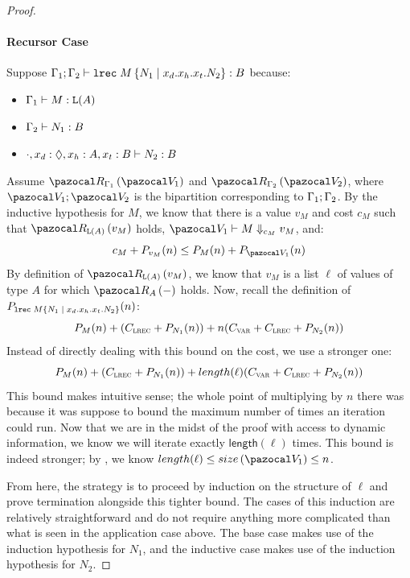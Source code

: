 \begin{proof}
\paragraph{Recursor Case} Suppose $\types{\ctxappend{\ctx_1}{\ctx_2}}{\tmrec{M}{N_1}{x_d}{x_h}{x_t}{N_2}}{B}$ because:
\begin{itemize}
  \item $\types{\ctx_1}{M}{\tplist{A}}$
  \item $\Gamma_2 \vdash N_1 : B$
  \item $\types{\ctxcons{\ctxcons{\ctxcons{\ctxnil}{x_d}{\tpdiam}}{x_h}{A}}{x_t}{B}}{N_2}{B}$
\end{itemize}

Assume $\Renv{\Gamma_1}{\env_1}$ and $\Renv{\Gamma_2}{\env_2}$, where $\envappend{\env_1}{\env_2}$ is the bipartition corresponding to $\Gamma_1 ; \Gamma_2$. By the inductive hypothesis for $M$, we know that there is a value $v_M$ and cost $c_M$ such that $\Rval{\tplist{A}}{v_M}$ holds, $\evals{\env_1}{M}{c_M}{v_M}$, and:
\[ c_M + P_{v_M}(n) \le P_M(n) + P_{\env_1}(n) \]
By definition of $\Rval{\tplist{A}}{v_M}$, we know that $v_M$ is a list $\ell$ of values of type $A$ for which $\Rval{A}{-}$ holds. Now, recall the definition of $P_{\tmrec{M}{N_1}{x_d}{x_h}{x_t}{N_2}}(n)$:
\[ P_M(n) + (C_{\textsc{lrec}} + P_{N_1}(n)) + n (C_{\textsc{var}} + C_{\textsc{lrec}} + P_{N_2}(n)) \]
Instead of directly dealing with this bound on the cost, we use a stronger one:
\[ P_M(n) + (\Crec + P_{N_1}(n)) + \mathsf{length}(\ell) (\Cvar + \Crec + P_{N_2}(n)) \]
This bound makes intuitive sense; the whole point of multiplying by $n$ there was because it was suppose to bound the maximum number of times an iteration could run. Now that we are in the midst of the proof with access to dynamic information, we know we will iterate exactly $\mathsf{length}(\ell)$ times. This bound is indeed stronger; by , we know $\mathsf{length}(\ell) \le \envsize{\env_1} \le n$.

From here, the strategy is to proceed by induction on the structure of $\ell$ and prove termination alongside this tighter bound. The cases of this induction are relatively straightforward and do not require anything more complicated than what is seen in the application case above. The base case makes use of the induction hypothesis for $N_1$, and the inductive case makes use of the induction hypothesis for $N_2$.
\end{proof}
